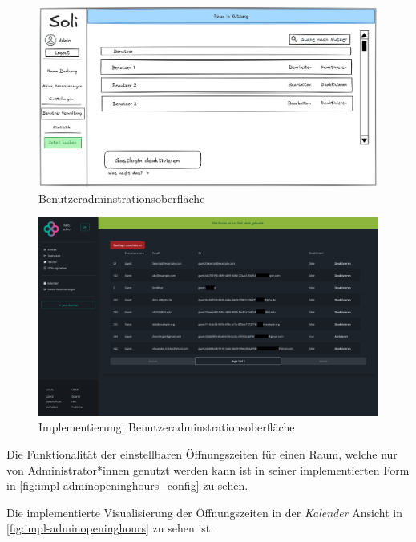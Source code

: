 \begin{figure}[ht]
    \centering
    \includegraphics[width=\textwidth]{figures/mockup/admin_users}
    \caption{Benutzeradminstrationsoberfläche}
    \label{fig:adminuser}
\end{figure}
\begin{figure}[ht]
    \centering
    \includegraphics[width=\textwidth]{figures/impl-views/admin_users}
    \caption{Implementierung: Benutzeradminstrationsoberfläche}
    \label{fig:impl-adminuser}
\end{figure}
\clearpage

Die Funktionalität der einstellbaren Öffnungszeiten für einen Raum, welche nur von Administrator*innen genutzt werden kann
ist in seiner implementierten Form in \ref{fig:impl-adminopeninghours_config} zu sehen.


Die implementierte Visualisierung der Öffnungszeiten in der \textit{Kalender} Ansicht in \ref{fig:impl-adminopeninghours} zu sehen ist.

